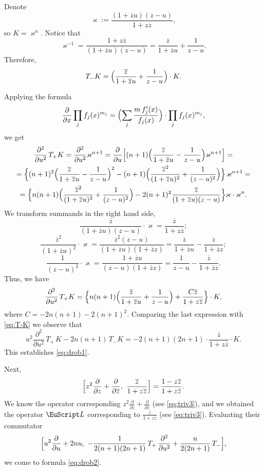 \documentclass[]{amsart}
\def\kappa{\varkappa}
\def\cL{\EuScript L}
\def\ov{\overline}
\def\sm{\smallskip}
\begin{document}
Denote
$$
\kappa:=\frac{(1+\ov z u)(z-u)}{1+z\ov z},
$$
so $K=\kappa^n$.
Notice that 
$$
\kappa^{-1}=
\frac{1+z\ov z}{(1+\ov z u)(z-u)}=\frac{\ov z}{1+ \ov z u}+
\frac1{z-u}.
$$
Therefore,
\begin{equation}
T_- K=\Bigl(\frac{\ov z}{1+ \ov z u}+
\frac1{z-u}\Bigr) \cdot K.
\label{eq:T-K}
\end{equation}

Applying the formula
\begin{equation}
\frac{\partial}{\partial x}\prod_j f_j(x)^{m_j} 
=
\Bigl(\sum_j \frac{m\,  f'_j(x) }{f_j(x)} \Bigr)
\cdot
\prod_j f_j(x)^{m_j}, 
\label{eq:logarithmic}
\end{equation}
we get
\begin{multline}
\frac{\partial^2}{\partial u^2}\, T_+ K
=\frac{\partial^2}{\partial u^2} \kappa^{n+1}=
\frac{\partial}{\partial u}\Bigl[(n+1)\Bigl(\frac{\ov z}{1+\ov z u}-\frac{1}{z-u} \Bigr) \kappa^{n+1}\Bigr]
=\\=
\Bigl\{(n+1)^2\Bigl(\frac{\ov z}{1+\ov z u}-\frac{1}{z-u} \Bigr)^2
-(n+1)\Bigl(\frac{\ov z^2}{(1+\ov z u)^2}+\frac{1}{(z-u)^2} \Bigr)\Bigl\}
\,\kappa^{n+1}
=\\=
\Bigl\{n(n+1)\Bigl(\frac{\ov z^2}{(1+\ov z u)^2}+\frac{1}{(z-u)^2} \Bigr)-2(n+1)^2 \frac{\ov z}{(1+\ov z u)(z-u)}
\Bigr\}\kappa\cdot \kappa^n.
\end{multline}
We transform summands in the right hand side,
$$
\frac{\ov z}{(1+\ov z u)(z-u)}\cdot \kappa=\frac{\ov z}{1+z \ov z};
$$
$$
\frac{\ov z^2}{(1+\ov z u)^2}\cdot \kappa=
\frac{\ov z^2(z-u)}{(1+\ov z u)(1+\ov z z)}
=\frac{\ov z}{1+\ov z u} - \frac{\ov z}{1+\ov z z};
$$
$$
\frac{1}{(z-u)^2}\cdot \kappa =\frac{1+\ov z u}{(z-u)(1+\ov z z)}
=\frac{1}{z-u}-\frac{\ov z}{1+\ov z z}.
$$
Thus, we have
\begin{equation}
\frac{\partial^2}{\partial u^2}\, T_+ K
=\Bigl\{
n(n+1)\Bigl(\frac{\ov z}{1+\ov z u}+ \frac{1}{z-u}\Bigr)
+ \frac{C\ov z}{1+z\ov z}
\Bigr\}\cdot K,
\label{eq:partial2K}
\end{equation}
where $C=-2n(n+1)-2(n+1)^2$. Comparing the last expression
with \eqref{eq:T-K} we observe that
$$
u^2\frac{\partial^2}{\partial u^2}\,T_+\, K-2n(n+1) \,T_- K=
-2(n+1)(2n+1)\cdot \frac{\ov z}{1+z \ov z}\cdot K.
$$
This establishes \eqref{eq:drob1}.

\sm

Next,
$$
\Bigl[z^2\frac{\partial}{\partial z}+\frac{\partial}{\partial \ov z},\,\,
\frac{\ov z}{1+z \ov z}\Bigr]=\frac{1 - z\ov z}{1+z \ov z}.
$$
We know the operator corresponding $z^2\frac{\partial}{\partial z}+\frac{\partial}{\partial \ov z}$  (see \eqref{eq:triv3}),
and we obtained the operator $\cL$ corresponding to $\frac{\ov z}{1+z \ov z}$
(see \eqref{eq:triv3}). Evaluating their commutator
$$
\Bigl[u^2 \frac{\partial}{\partial u}+2nu,\,\,
-\frac1{2(n+1)(2n+1)}\, T_+\, \frac{\partial^2}{\partial u^2}
+\frac{n}{2(2n+1)}\,T_-\Bigr],
$$
we come to  formula \eqref{eq:drob2}.
\end{document}
